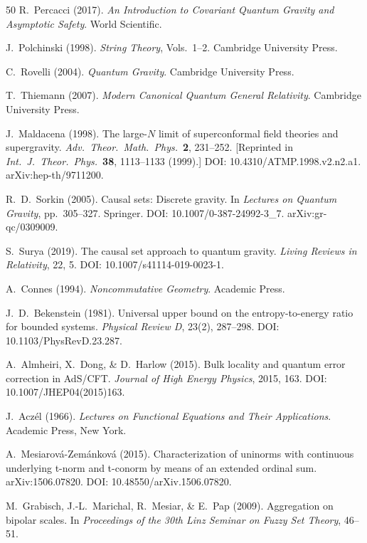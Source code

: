 \documentclass[aps,prd,twocolumn,superscriptaddress,nofootinbib]{revtex4-2}
\begin{document}
\begin{thebibliography}{50}
R.~Percacci (2017).
\textit{An Introduction to Covariant Quantum Gravity and Asymptotic Safety}.
World Scientific.

J.~Polchinski (1998).
\textit{String Theory}, Vols.~1--2.
Cambridge University Press.

C.~Rovelli (2004).
\textit{Quantum Gravity}.
Cambridge University Press.

T.~Thiemann (2007).
\textit{Modern Canonical Quantum General Relativity}.
Cambridge University Press.

J.~Maldacena (1998).
The large-$N$ limit of superconformal field theories and supergravity.
\textit{Adv.\ Theor.\ Math.\ Phys.}\ \textbf{2}, 231--252.
[Reprinted in \textit{Int.\ J.\ Theor.\ Phys.}\ \textbf{38}, 1113--1133 (1999).]
DOI: 10.4310/ATMP.1998.v2.n2.a1.
arXiv:hep-th/9711200.

R.~D.~Sorkin (2005).
Causal sets: Discrete gravity.
In \textit{Lectures on Quantum Gravity}, pp.\ 305--327.
Springer.
DOI: 10.1007/0-387-24992-3\_7.
arXiv:gr-qc/0309009.

S.~Surya (2019).
The causal set approach to quantum gravity.
\textit{Living Reviews in Relativity}, 22, 5.
DOI: 10.1007/s41114-019-0023-1.

A.~Connes (1994).
\textit{Noncommutative Geometry}.
Academic Press.

J.~D.~Bekenstein (1981).
Universal upper bound on the entropy-to-energy ratio for bounded systems.
\textit{Physical Review D}, 23(2), 287--298.
DOI: 10.1103/PhysRevD.23.287.

A.~Almheiri, X.~Dong, \& D.~Harlow (2015).
Bulk locality and quantum error correction in AdS/CFT.
\textit{Journal of High Energy Physics}, 2015, 163.
DOI: 10.1007/JHEP04(2015)163.

J.~Acz\'el (1966).
\textit{Lectures on Functional Equations and Their Applications}.
Academic Press, New York.

A.~Mesiarov\'a-Zem\'ankov\'a (2015).
Characterization of uninorms with continuous underlying t-norm and t-conorm by means of an extended ordinal sum.
arXiv:1506.07820.
DOI: 10.48550/arXiv.1506.07820.

M.~Grabisch, J.-L.~Marichal, R.~Mesiar, \& E.~Pap (2009).
Aggregation on bipolar scales.
In \textit{Proceedings of the 30th Linz Seminar on Fuzzy Set Theory}, 46--51.


\end{thebibliography}
\end{document}
